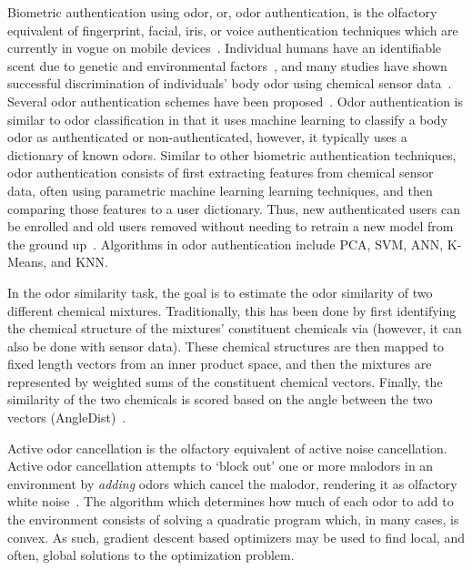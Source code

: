Biometric authentication using odor, or, odor authentication, is the olfactory
equivalent of fingerprint, facial, iris, or voice authentication techniques
which are currently in vogue on mobile devices~\cite{stokkenes2016biometric}.
Individual humans have an identifiable scent due to genetic and environmental
factors~\cite{penn2007individual}, and many studies have shown successful
discrimination of individuals' body odor using chemical sensor
data~\cite{wongchoosuk2009detection, jha2015quick, jha2016gc}. Several odor
authentication schemes have been proposed~\cite{yang2018human,
shu2014identification}. Odor authentication is similar to odor classification
in that it uses machine learning to classify a body odor as authenticated or
non-authenticated, however, it typically uses a dictionary of known odors.
Similar to other biometric authentication techniques, odor authentication
consists of first extracting features from chemical sensor data, often using
parametric machine learning learning techniques, and then comparing those
features to a user dictionary. Thus, new authenticated users can be enrolled
and old users removed without needing to retrain a new model from the ground
up~\cite{wong2001enhanced}. Algorithms in odor authentication include PCA, SVM,
ANN, K-Means, and KNN.

In the odor similarity task, the goal is to estimate the odor similarity of two
different chemical mixtures.  Traditionally, this has been done by first
identifying the chemical structure of the mixtures' constituent chemicals via
\gcms{} (however, it can also be done with sensor data).  These
chemical structures are then mapped to fixed length vectors from an inner
product space, and then the mixtures are represented by weighted sums of the
constituent chemical vectors.  Finally, the similarity of the two chemicals is
scored based on the angle between the two vectors
(AngleDist)~\cite{snitz2013predicting}.

Active odor cancellation is the olfactory equivalent of active noise
cancellation.  Active odor cancellation attempts to `block out' one or more
malodors in an environment by \textit{adding} odors which cancel the malodor,
rendering it as olfactory white noise~\cite{varshney2014active}.
The algorithm which determines how much of each odor to add to the environment
consists of solving a quadratic program which, in many cases, is convex. As
such, gradient descent based optimizers may be used to find local, and often,
global solutions to the optimization problem.

